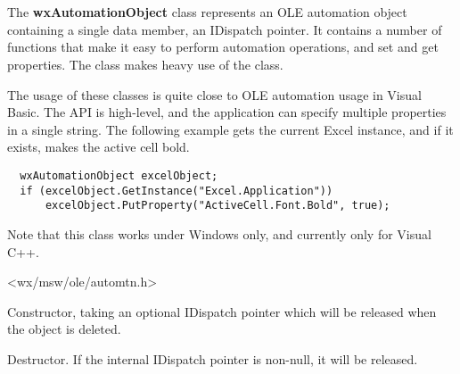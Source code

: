 \section{}\label{wxautomationobject}

The {\bf wxAutomationObject} class represents an OLE automation object containing a single data member,
an IDispatch pointer. It contains a number of functions that make it easy to perform
automation operations, and set and get properties. The class makes heavy use of the  class.

The usage of these classes is quite close to OLE automation usage in Visual Basic. The API is
high-level, and the application can specify multiple properties in a single string. The following example
gets the current Excel instance, and if it exists, makes the active cell bold.

{\small
\begin{verbatim}
  wxAutomationObject excelObject;
  if (excelObject.GetInstance("Excel.Application"))
      excelObject.PutProperty("ActiveCell.Font.Bold", true);
\end{verbatim}
}

Note that this class works under Windows only, and currently only for Visual C++.




<wx/msw/ole/automtn.h>




\label{wxautomationobjectctor}


Constructor, taking an optional IDispatch pointer which will be released when the
object is deleted.

\label{wxautomationobjectdtor}


Destructor. If the internal IDispatch pointer is non-null, it will be released.

\label{wxautomationobjectcallmethod}

